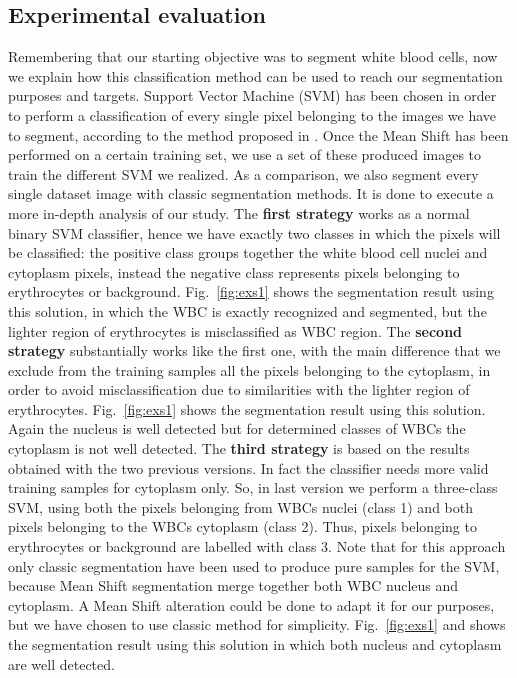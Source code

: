 \documentclass[final,a4paper,12pt,english]{UnicaPhdThesis3}
\begin{document}
\subsection{Experimental evaluation}
Remembering that our starting objective was to segment white blood cells, now we explain how this classification method can be used to reach our segmentation purposes and targets. Support Vector Machine (SVM) has been chosen in order to perform a classification of every single pixel belonging to the images we have to segment, according to the method proposed in \cite{Pan}. Once the Mean Shift has been performed on a certain training set, we use a set of these produced images to train the different SVM we realized. As a comparison, we also segment every single dataset image with classic segmentation methods. It is done to execute a more in-depth analysis of our study. The \textbf{first strategy} works as a normal binary SVM classifier, hence we have exactly two classes in which the pixels will be classified: the positive class groups together the white blood cell nuclei and cytoplasm pixels, instead the negative class represents pixels belonging to erythrocytes or background. Fig.~\ref{fig:exs1} shows the segmentation result using this solution, in which the WBC is exactly recognized and segmented, but the lighter region of erythrocytes is misclassified as WBC region. The \textbf{second strategy} substantially works like the first one, with the main difference that we exclude from the training samples all the pixels belonging to the cytoplasm, in order to avoid misclassification due to similarities with the lighter region of erythrocytes. Fig.~\ref{fig:exs1} shows the segmentation result using this solution. Again the nucleus is well detected but for determined classes of WBCs the cytoplasm is not well detected. The \textbf{third strategy} is based on the results obtained with the two previous versions. In fact the classifier needs more valid training samples for cytoplasm only. So, in last version we perform a three-class SVM, using both the pixels belonging from WBCs nuclei (class 1) and both pixels belonging to the WBCs cytoplasm (class 2). Thus, pixels belonging to erythrocytes or background are labelled with class 3. Note that for this approach only classic segmentation have been used to produce pure samples for the SVM, because Mean Shift segmentation merge together both WBC nucleus and cytoplasm. A Mean Shift alteration could be done to adapt it for our purposes, but we have chosen to use classic method for simplicity. Fig.~\ref{fig:exs1} and shows the segmentation result using this solution in which both nucleus and cytoplasm are well detected.
\end{document}
